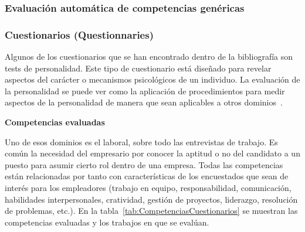 \subsubsection{Evaluación automática de competencias genéricas}
\subsubsection{Cuestionarios (Questionnaries)}

Algunos de los cuestionarios que se han encontrado dentro de la bibliografía son tests de personalidad. Este tipo de cuestionario está diseñado para revelar aspectos del carácter o mecanismos psicológicos de un individuo. La evaluación de la personalidad se puede ver como la aplicación de procedimientos para medir aspectos de la personalidad de manera que sean aplicables a otros dominios~\cite{wiggins2003paradigms}. 

\bigskip
\textbf{Competencias evaluadas}
\bigskip

Uno de esos dominios es el laboral, sobre todo las entrevistas de trabajo. Es común la necesidad del empresario por conocer la aptitud o no del candidato a un puesto para asumir cierto rol dentro de una empresa. Todas las competencias están relacionadas por tanto con características de los encuestados que sean de interés para los empleadores (trabajo en equipo, responsabilidad, comunicación, habilidades interpersonales, cratividad, gestión de proyectos, liderazgo, resolución de problemas, etc.). En la tabla~\ref{tab:CompetenciasCuestionarios} se muestran las competencias evaluadas y los trabajos en que se evalúan.

